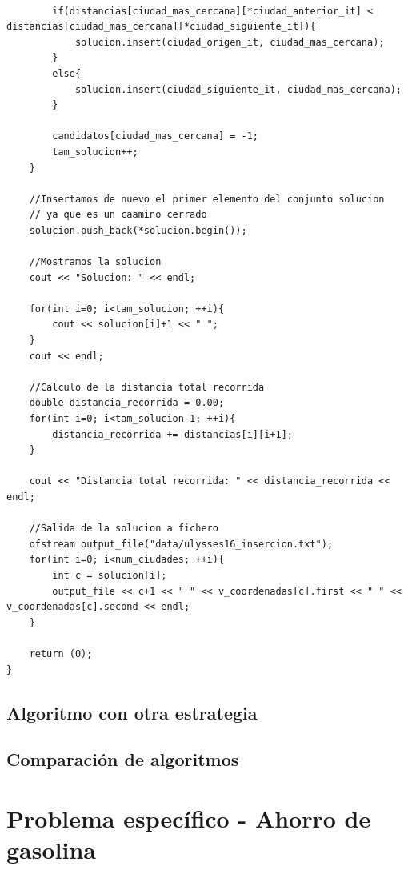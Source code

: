 \documentclass[11pt,a4paper]{article} %
\begin{document}
\begin{lstlisting}[style=C++]
		
		if(distancias[ciudad_mas_cercana][*ciudad_anterior_it] < distancias[ciudad_mas_cercana][*ciudad_siguiente_it]){
			solucion.insert(ciudad_origen_it, ciudad_mas_cercana);
		}
		else{
			solucion.insert(ciudad_siguiente_it, ciudad_mas_cercana);
		}
		
		candidatos[ciudad_mas_cercana] = -1;
		tam_solucion++;
	}
	
	//Insertamos de nuevo el primer elemento del conjunto solucion
	// ya que es un caamino cerrado
	solucion.push_back(*solucion.begin());
	
	//Mostramos la solucion
	cout << "Solucion: " << endl;
	
	for(int i=0; i<tam_solucion; ++i){
		cout << solucion[i]+1 << " ";
	}
	cout << endl;
	
	//Calculo de la distancia total recorrida
	double distancia_recorrida = 0.00;
	for(int i=0; i<tam_solucion-1; ++i){
		distancia_recorrida += distancias[i][i+1];
	}
	
	cout << "Distancia total recorrida: " << distancia_recorrida << endl;
	
	//Salida de la solucion a fichero
	ofstream output_file("data/ulysses16_insercion.txt");
	for(int i=0; i<num_ciudades; ++i){
		int c = solucion[i];
		output_file << c+1 << " " << v_coordenadas[c].first << " " << v_coordenadas[c].second << endl;
	}
	
	return (0);
}
\end{lstlisting}


\newpage
\subsection{Algoritmo con otra estrategia}


\newpage
\subsection{Comparación de algoritmos}


\newpage
\section{Problema específico - Ahorro de gasolina}


\end{document}
